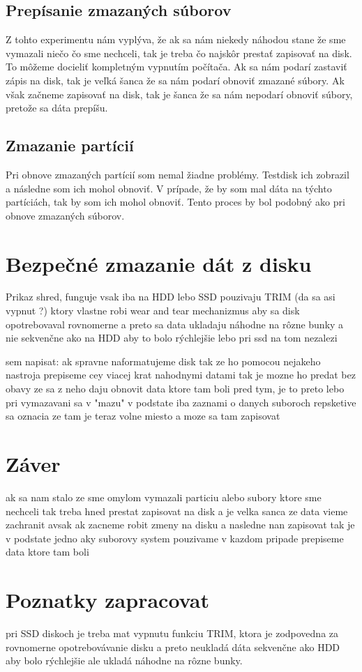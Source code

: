 \documentclass[12pt,oneside,slovak,a4paper]{article}
\begin{document}
\subsection{Prepísanie zmazaných súborov}
Z tohto experimentu nám vyplýva, že ak sa nám niekedy náhodou stane že sme vymazali niečo čo sme nechceli, tak je treba čo najskôr prestať zapisovať na disk. To môžeme docieliť kompletným vypnutím počítača. Ak sa nám podarí zastaviť zápis na disk, tak je veľká šanca že sa nám podarí obnoviť zmazané súbory. Ak však začneme zapisovať na disk, tak je šanca že sa nám nepodarí obnoviť súbory, pretože sa dáta prepíšu.

\subsection{Zmazanie partícií}
Pri obnove zmazaných partícií som nemal žiadne problémy. Testdisk ich zobrazil a následne som ich mohol obnoviť. V prípade, že by som mal dáta na týchto partíciách, tak by som ich mohol obnoviť. Tento proces by bol podobný ako pri obnove zmazaných súborov.

\section{Bezpečné zmazanie dát z disku}
Prikaz shred, funguje vsak iba na HDD lebo SSD pouzivaju TRIM (da sa asi vypnut ?) ktory vlastne robi wear and tear mechanizmus aby sa disk opotrebovaval rovnomerne a preto sa data ukladaju náhodne na rôzne bunky a nie sekvenčne ako na HDD aby to bolo rýchlejšie lebo pri ssd na tom nezalezi

sem napisat: ak spravne naformatujeme disk tak ze ho pomocou nejakeho nastroja prepiseme cey viacej krat nahodnymi datami tak je mozne ho predat bez obavy ze sa z neho daju obnovit data ktore tam boli pred tym, je to preto lebo pri vymazavani sa v "mazu" v podstate iba zaznami o danych suboroch repsketive sa oznacia ze tam je teraz volne miesto a moze sa tam zapisovat

\section{Záver}
ak sa nam stalo ze sme omylom vymazali particiu alebo subory ktore sme nechceli tak treba hned prestat zapisovat na disk a je velka sanca ze data vieme zachranit avsak ak zacneme robit zmeny na disku a nasledne nan zapisovat tak je v podstate jedno aky suborovy system pouzivame v kazdom pripade prepiseme data ktore tam boli


\section{Poznatky zapracovat}

pri SSD diskoch je treba mat vypnutu funkciu TRIM, ktora je zodpovedna za rovnomerne opotrebovávanie disku a preto neukladá dáta sekvenčne ako HDD aby bolo rýchlejšie ale ukladá náhodne na rôzne bunky.


\pagebreak


\end{document}
